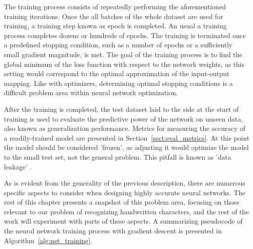\documentclass{article}
\begin{document}
The training process consists of repeatedly performing the aforementioned training 
iterations. Once the all batches of the whole dataset are used for training,
a training step known as epoch is completed. An usual a training process 
completes dozens or hundreds of epochs. The training is terminated once a predefined 
stopping condition, such as a number of epochs or a sufficiently small gradient 
magnitude, is met. The goal of the training process is to find the global minimum of the loss 
function with respect to the network weights, as this setting would correspond to 
the optimal approximation of the input-output mapping. Like with optimizers, 
determining optimal stopping conditions is a difficult problem area within neural network optimization.

After the training is completed, the test dataset laid to the side at the start of 
training is used to evaluate the predictive power of the network on unseen data, 
also known as generalization performance. Metrics for measuring the accuracy 
of a readily-trained model are presented in Section~\ref{sect:eval_metrics}.
At this point the model should be considered 'frozen', as adjusting it would 
optimize the model to the small test set, not the general problem. This pitfall is 
known as 'data leakage' \cite{engbook}.

As is evident from the generality of the previous description, there are numerous 
specific aspects to consider when designing highly accurate neural networks. The 
rest of this chapter presents a snapshot of this problem area, focusing on those 
relevant to our problem of recognizing handwritten characters, and the rest of the 
work will experiment with parts of these aspects. A summarizing pseudocode of the 
neural network training process with gradient descent is presented in Algorithm~\ref{alg:net_training}.
\end{document}
